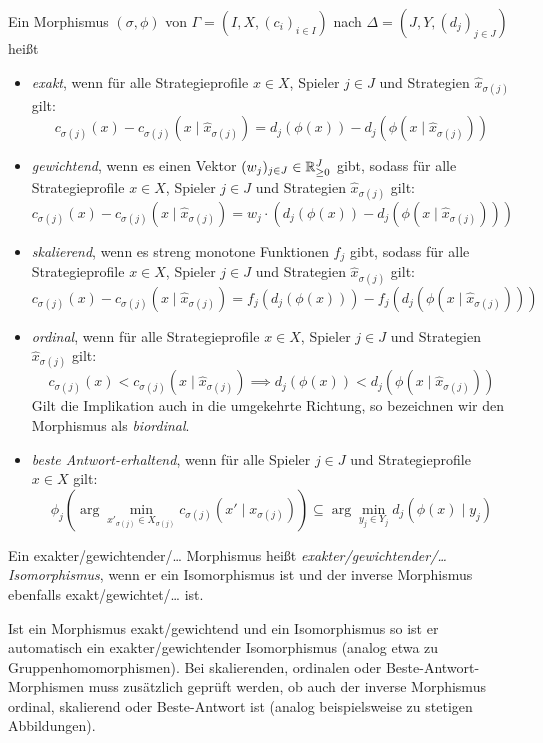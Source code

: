 \begin{defn}\label{def:PotentialMorphismen}
	Ein Morphismus $(\sigma, \phi)$ von $\Gamma = (I, X, (c_i)_{i\in I})$ nach $\Delta = (J, Y, (d_j)_{j\in J})$ heißt
	\begin{itemize}
		\item \emph{exakt}, wenn für alle Strategieprofile $x \in X$, Spieler $j \in J$ und Strategien $\hat{x}_{\sigma(j)}$ gilt:
		\[c_{\sigma(j)}(x) - c_{\sigma(j)}(x \mid \hat{x}_{\sigma(j)}) = d_j(\phi(x)) - d_j(\phi(x \mid \hat{x}_{\sigma(j)}))\]
		\item \emph{gewichtend}, wenn es einen Vektor $(w_j)_{j \in J} \in \mathbb{R}_{\geq 0}^J$ gibt, sodass für alle Strategieprofile $x \in X$, Spieler $j \in J$ und Strategien $\hat{x}_{\sigma(j)}$ gilt:
		\[c_{\sigma(j)}(x) - c_{\sigma(j)}(x \mid \hat{x}_{\sigma(j)}) = w_j\cdot\left(d_j(\phi(x)) - d_j(\phi(x \mid \hat{x}_{\sigma(j)}))\right)\]
		\item \emph{skalierend}, wenn es streng monotone Funktionen $f_j$ gibt, sodass für alle Strategieprofile $x \in X$, Spieler $j \in J$ und Strategien $\hat{x}_{\sigma(j)}$ gilt:
		\[c_{\sigma(j)}(x) - c_{\sigma(j)}(x \mid \hat{x}_{\sigma(j)}) = f_j(d_j(\phi(x))) - f_j(d_j(\phi(x \mid \hat{x}_{\sigma(j)})))\]
		\item \emph{ordinal}, wenn für alle Strategieprofile $x \in X$, Spieler $j \in J$ und Strategien $\hat{x}_{\sigma(j)}$ gilt:
		\[c_{\sigma(j)}(x) < c_{\sigma(j)}(x \mid \hat{x}_{\sigma(j)}) \implies d_j(\phi(x)) < d_j(\phi(x \mid \hat{x}_{\sigma(j)}))\]
		Gilt die Implikation auch in die umgekehrte Richtung, so bezeichnen wir den Morphismus als \emph{biordinal}.
		\item \emph{beste Antwort-erhaltend}, wenn für alle Spieler $j \in J$ und Strategieprofile $x \in X$ gilt:
		\[\phi_j(\arg \min_{x'_{\sigma(j)} \in X_{\sigma(j)}}c_{\sigma(j)}(x' \mid x_{\sigma(j)})) \subseteq \arg \min_{y_j \in Y_j} d_j(\phi(x) \mid y_j)\]
	\end{itemize}	
	Ein exakter/gewichtender/\dots{} Morphismus heißt \emph{exakter/gewichtender/\dots{} Isomorphismus}, wenn er ein Isomorphismus ist und der inverse Morphismus ebenfalls exakt/gewichtet/\dots{} ist.
\end{defn}

\begin{bem}
	Ist ein Morphismus exakt/gewichtend und ein Isomorphismus so ist er automatisch ein exakter/gewichtender Isomorphismus (analog etwa zu Gruppenhomomorphismen). Bei skalierenden, ordinalen oder Beste-Antwort-Morphismen muss zusätzlich geprüft werden, ob auch der inverse Morphismus ordinal, skalierend oder Beste-Antwort ist (analog beispielsweise zu stetigen Abbildungen).
\end{bem}

